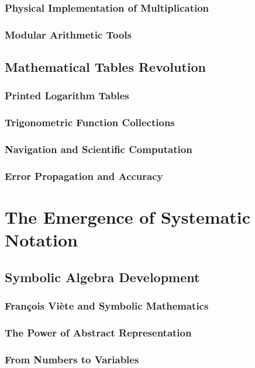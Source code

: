\documentclass[12pt, oneside]{book}
\begin{document}
\subsubsection{Physical Implementation of Multiplication}
\subsubsection{Modular Arithmetic Tools}

\subsection{Mathematical Tables Revolution}
\subsubsection{Printed Logarithm Tables}
\subsubsection{Trigonometric Function Collections}
\subsubsection{Navigation and Scientific Computation}
\subsubsection{Error Propagation and Accuracy}

\section{The Emergence of Systematic Notation}
\subsection{Symbolic Algebra Development}
\subsubsection{François Viète and Symbolic Mathematics}
\subsubsection{The Power of Abstract Representation}
\subsubsection{From Numbers to Variables}
\end{document}

